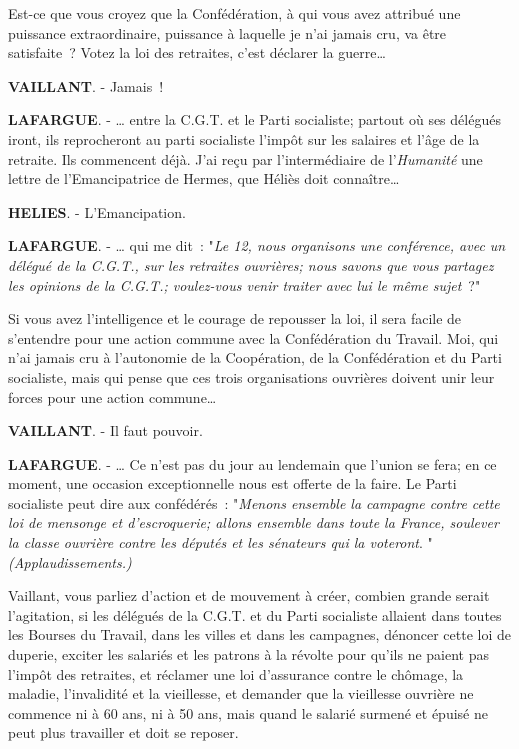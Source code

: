 \documentclass[french,twoside]{book} %
\begin{document}
Est-ce que vous croyez que la Confédération, à qui vous avez attribué une puissance extraordinaire, puissance à laquelle je n’ai jamais cru, va être satisfaite ? Votez la loi des retraites, c’est déclarer la guerre…\par
\textbf{VAILLANT}. - Jamais !\par
\textbf{LAFARGUE}. - … entre la C.G.T. et le Parti socialiste; partout où ses délégués iront, ils reprocheront au parti socialiste l’impôt sur les salaires et l’âge de la retraite. Ils commencent déjà. J'ai reçu par l’intermédiaire de l’\emph{Humanité} une lettre de l’Emancipatrice de Hermes, que Héliès doit connaître…\par
\textbf{HELIES}. - L'Emancipation.\par
\textbf{LAFARGUE}. - … qui me dit : "\emph{Le 12, nous organisons une conférence, avec un délégué de la C.G.T., sur les retraites ouvrières; nous savons que vous partagez les opinions de la C.G.T.; voulez-vous venir traiter avec lui le même sujet} ?"\par
Si vous avez l’intelligence et le courage de repousser la loi, il sera facile de s’entendre pour une action commune avec la Confédération du Travail. Moi, qui n’ai jamais cru à l’autonomie de la Coopération, de la Confédération et du Parti socialiste, mais qui pense que ces trois organisations ouvrières doivent unir leur forces pour une action commune…\par
\textbf{VAILLANT}. - Il faut pouvoir.\par
\textbf{LAFARGUE}. - … Ce n’est pas du jour au lendemain que l’union se fera; en ce moment, une occasion exceptionnelle nous est offerte de la faire. Le Parti socialiste peut dire aux confédérés : "\emph{Menons ensemble la campagne contre cette loi de mensonge et d’escroquerie; allons ensemble dans toute la France, soulever la classe ouvrière contre les députés et les sénateurs qui la voteront}. " \emph{(Applaudissements.)}\par
Vaillant, vous parliez d’action et de mouvement à créer, combien grande serait l’agitation, si les délégués de la C.G.T. et du Parti socialiste allaient dans toutes les Bourses du Travail, dans les villes et dans les campagnes, dénoncer cette loi de duperie, exciter les salariés et les patrons à la révolte pour qu’ils ne paient pas l’impôt des retraites, et réclamer une loi d’assurance contre le chômage, la maladie, l’invalidité et la vieillesse, et demander que la vieillesse ouvrière ne commence ni à 60 ans, ni à 50 ans, mais quand le salarié surmené et épuisé ne peut plus travailler et doit se reposer.\par
\end{document}
